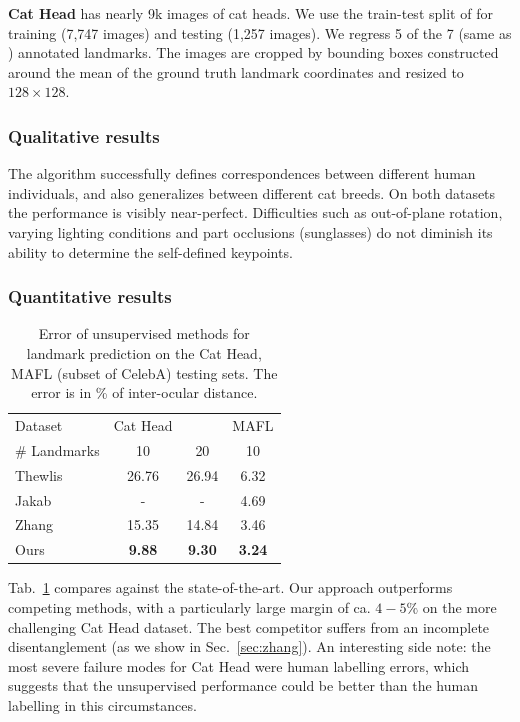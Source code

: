 			\begin{tcolorbox}
				\textbf{Cat Head} \cite{zhang08cathead}  has nearly 9k images of cat heads.
				We use the train-test split of \cite{zhang18} for training (7,747 images) and testing (1,257 images).
				We regress 5 of the 7 (same as \cite{zhang18}) annotated landmarks.
				The images are cropped by bounding boxes constructed around the mean of the ground truth landmark coordinates and resized to $128\times128$.
			\end{tcolorbox}

		\subsubsection{Qualitative results}
			The algorithm successfully defines correspondences between different human individuals, and also generalizes between different cat breeds.
			On both datasets the performance is visibly near-perfect.
			Difficulties such as out-of-plane rotation, varying lighting conditions and part occlusions (\eg sunglasses) do not diminish its ability to determine the self-defined keypoints.


		\subsubsection{Quantitative results}
			\begin{table}[t]
				\caption{Error of unsupervised methods for landmark prediction on the Cat Head, MAFL (subset of CelebA) testing sets. The error is in \% of inter-ocular distance.}
				\label{tab:faces}
				\centering
				\begin{tabular}{l|ccc}
				\hline
				Dataset & Cat Head &  & MAFL \\
				  \# Landmarks &10 & 20  & 10  \\
				  \hline
				 Thewlis \cite{thewlis17}
				 & 26.76 & 26.94 & 6.32    \\
				 Jakab \cite{jakab18}
				 & - & - & 4.69  \\
				 Zhang \cite{zhang18}
				 & 15.35 & 14.84 & 3.46  \\
				  Ours & \textbf{9.88}  & \textbf{9.30} & \textbf{3.24}  \\ \hline  %
				\end{tabular}
			\end{table}
			Tab.~\ref{tab:faces} compares against the state-of-the-art.
			Our approach outperforms competing methods, with a particularly large margin of ca. $4-5\%$ on the more challenging Cat Head dataset. The best competitor suffers from an incomplete disentanglement (as we show in Sec.~\ref{sec:zhang}).
			An interesting side note: the most severe failure modes for Cat Head were human labelling errors, which suggests that the unsupervised performance could be better than the human labelling in this circumstances.

